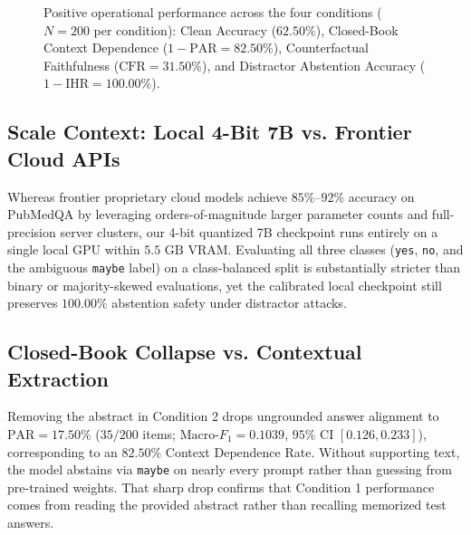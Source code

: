 \documentclass[10pt,twocolumn,letterpaper]{article}
\begin{document}
\begin{figure}[t]
\centering
{}
\caption{Positive operational performance across the four conditions ($N=200$ per condition): Clean Accuracy ($62.50\%$), Closed-Book Context Dependence ($1-\text{PAR} = 82.50\%$), Counterfactual Faithfulness ($\text{CFR} = 31.50\%$), and Distractor Abstention Accuracy ($1-\text{IHR} = 100.00\%$).}
\label{fig:matrix_eval}
\end{figure}

\subsection{Scale Context: Local 4-Bit 7B vs. Frontier Cloud APIs}
Whereas frontier proprietary cloud models achieve $85\%\text{--}92\%$ accuracy on PubMedQA by leveraging orders-of-magnitude larger parameter counts and full-precision server clusters, our 4-bit quantized 7B checkpoint runs entirely on a single local GPU within $5.5\text{ GB}$ VRAM. Evaluating all three classes (\texttt{yes}, \texttt{no}, and the ambiguous \texttt{maybe} label) on a class-balanced split is substantially stricter than binary or majority-skewed evaluations, yet the calibrated local checkpoint still preserves $100.00\%$ abstention safety under distractor attacks.

\subsection{Closed-Book Collapse vs. Contextual Extraction}
Removing the abstract in Condition 2 drops ungrounded answer alignment to $\text{PAR} = 17.50\%$ ($35/200$ items; $\text{Macro-}F_1 = 0.1039$, $95\%$ CI $[0.126, 0.233]$), corresponding to an $82.50\%$ Context Dependence Rate. Without supporting text, the model abstains via \texttt{maybe} on nearly every prompt rather than guessing from pre-trained weights. That sharp drop confirms that Condition 1 performance comes from reading the provided abstract rather than recalling memorized test answers.
\end{document}
